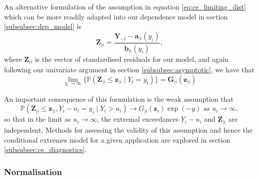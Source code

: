 \documentclass{article}
\numberwithin{equation}{section}
\begin{document}
An alternative formulation of the assumption in equation \ref{eq:ce_limiting_dist} which can be more readily adapted into our dependence model in section \ref{subsubsec:dep_model} is
\begin{equation} \label{eq:standardised_residuals}
  \bm{Z}_{\mid i} = \frac{\bm{Y}_{-i} - \bm{a}_{\mid i}(y_i)} {\bm{b}_{\mid i}(y_i)},
\end{equation}
where $\bm{Z}_{\mid i}$ is the vector of standardised residuals for our model, and again following our univariate argument in section \ref{subsubsec:asymptotic}, we have that
\[
      \lim_{y_i \rightarrow \infty}\{\mathbb{P}(\bm{Z}_{\mid i} \le \bm{z}_{\mid i} \mid Y_i = y_i)\} = \bm{G}_{\mid i}(\bm{z}_{\mid i})
\]

An important consequence of this formulation is the weak assumption that
\begin{equation} \label{eq:limit_independence}
\mathbb{P}(\bm{Z}_{\mid i} \le \bm{z}_{\mid i}, Y_i - u_i = y_i \mid Y_i > u_i) \rightarrow G_{\mid i}(\bm{z}_i) \exp(-y) \text{ as } u_i \rightarrow \infty,
\end{equation}
so that in the limit as $u_i \to \infty$, the extremal exceedances $Y_i - u_i$ and $\bm{Z}_{\mid i}$ are independent.
Methods for assessing the validity of this assumption and hence the conditional extremes model for a given application are explored in section \ref{subsubsec:ce_diagnostics}.

\subsubsection{Normalisation} \label{subsubsec:ce_normalisation}


\end{document}
